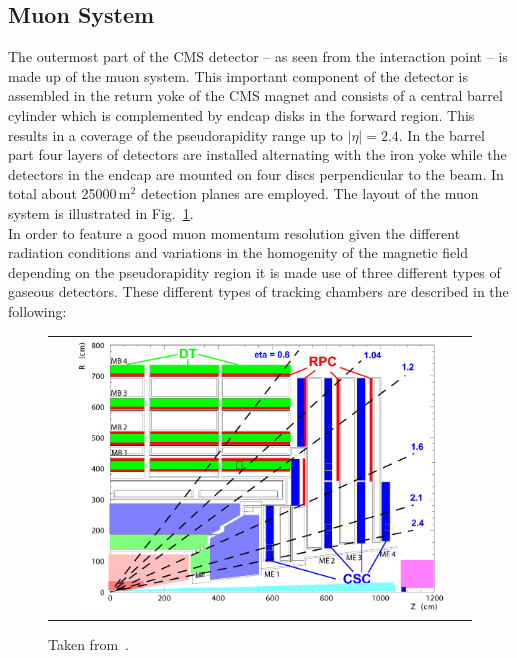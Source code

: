 \subsection{Muon System}
\label{subsec:cms_muon}
The outermost part of the CMS detector -- as seen from the interaction point -- is made up of the muon system. This important component of the detector is assembled in the return yoke of the CMS magnet and consists of a central barrel cylinder which is complemented by endcap disks in the forward region. This results in a coverage of the pseudorapidity range up to $|\eta| = 2.4$. In the barrel part four layers of detectors are installed alternating with the iron yoke while the detectors in the endcap are mounted on four discs perpendicular to the beam. In total about 25000\,$\mathrm{m}^2$ detection planes are employed. The layout of the muon system is illustrated in Fig.~\ref{fig:CMS_muon}. \\
In order to feature a good muon momentum resolution given the different radiation conditions and variations in the homogenity of the magnetic field depending on the pseudorapidity region it is made use of three different types of gaseous detectors. These different types of tracking chambers are described in the following:
\begin{figure}[!tp]
  \centering
  \begin{tabular}{c}
    \includegraphics[width=0.9\textwidth]{figures/Figures_Experimental_Apparatus_MuonDetector.png}
  \end{tabular}
  \caption{Taken from~\cite{bib:cmsptdr1}.}
  \label{fig:CMS_muon}
\end{figure}


